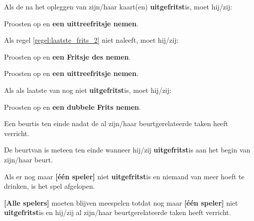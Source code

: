 \vervolgLijst{}
    \item Als de \huidigeSpeler na het opleggen van zijn/haar kaart(en) \textbf{uitgefritst}\footnotemark[4] is, moet hij/zij:
    \puntLijst{}
        \item Proosten op  en \textbf{een uittreefritsje nemen}\footnotemark[3].
    \eindPuntLijst{}
    \label{regel:laatste_frits_2}
\eindLijst{}

\vervolgLijst{}
    \item Als \eenSpeler regel \ref{regel:laatste_frits_2} niet naleeft, moet hij/zij:
    \puntLijst{}
        \item Proosten op  en \textbf{een Fritsje des nemen}\footnotemark[3].
        \item Proosten op  en \textbf{een uittreefritsje nemen}\footnotemark[3].
    \eindPuntLijst{}
\eindLijst{}

\vervolgLijst{}
    \item Als \eenSpeler als laatste van \alleSpelers nog niet \textbf{uitgefritst}\footnotemark[2] is, moet hij/zij:
    \puntLijst{}
        \item Proosten op  en \textbf{een dubbele Frits nemen}\footnotemark[4].
    \eindPuntLijst{}
\eindLijst{}


\vervolgLijst{}
    \item Een beurt\footnotemark[1] is ten einde nadat de \huidigeSpeler al zijn/haar beurtgerelateerde taken heeft verricht.
\eindLijst{}

\vervolgLijst{}
    \item De beurt\footnotemark[1] van \eenSpeler is meteen ten einde wanneer hij/zij \textbf{uitgefritst}\footnotemark[2] is aan het begin van zijn/haar beurt. 
\eindLijst{}

\vervolgLijst{}
    \item Als er nog maar \textbf{[\'e\'en speler]} niet \textbf{uitgefritst}\footnotemark[2] is en niemand van \alleSpelers meer hoeft te drinken, is het spel afgelopen.
\eindLijst{}

\vervolgLijst{}
    \item \textbf{[Alle spelers]} moeten blijven meespelen totdat nog maar \textbf{[één speler]} niet \textbf{uitgefritst}\footnotemark[3] is en hij/zij al zijn/haar beurtgerelateerde taken heeft verricht.
\eindLijst{}  

